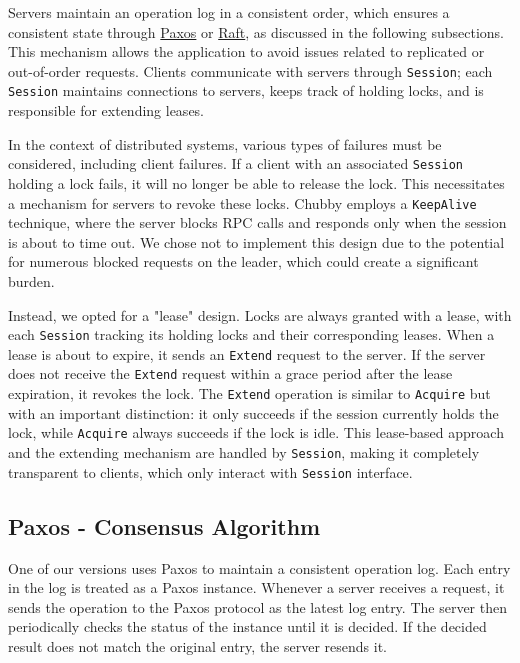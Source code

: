 \documentclass[11pt,a4paper]{article}
\begin{document}
Servers maintain an operation log in a consistent order, which ensures a consistent state through \hyperref[subsecPaxos]{Paxos} or \hyperref[subsecRaft]{Raft}, as discussed in the following subsections. This mechanism allows the application to avoid issues related to replicated or out-of-order requests. Clients communicate with servers through \verb|Session|; each \verb|Session| maintains connections to servers, keeps track of holding locks, and is responsible for extending leases.

In the context of distributed systems, various types of failures must be considered, including client failures. If a client with an associated \verb|Session| holding a lock fails, it will no longer be able to release the lock. This necessitates a mechanism for servers to revoke these locks. Chubby employs a \verb|KeepAlive| technique, where the server blocks RPC calls and responds only when the session is about to time out. We chose not to implement this design due to the potential for numerous blocked requests on the leader, which could create a significant burden.

Instead, we opted for a "lease" design. Locks are always granted with a lease, with each \verb|Session| tracking its holding locks and their corresponding leases. When a lease is about to expire, it sends an \verb|Extend| request to the server. If the server does not receive the \verb|Extend| request within a grace period after the lease expiration, it revokes the lock. The \verb|Extend| operation is similar to \verb|Acquire| but with an important distinction: it only succeeds if the session currently holds the lock, while \verb|Acquire| always succeeds if the lock is idle. This lease-based approach and the extending mechanism are handled by \verb|Session|, making it completely transparent to clients, which only interact with \verb|Session| interface.

\subsection{Paxos - Consensus Algorithm}\label{subsecPaxos}
One of our versions uses Paxos to maintain a consistent operation log. Each entry in the log is treated as a Paxos instance. Whenever a server receives a request, it sends the operation to the Paxos protocol as the latest log entry. The server then periodically checks the status of the instance until it is decided. If the decided result does not match the original entry, the server resends it.
\end{document}
